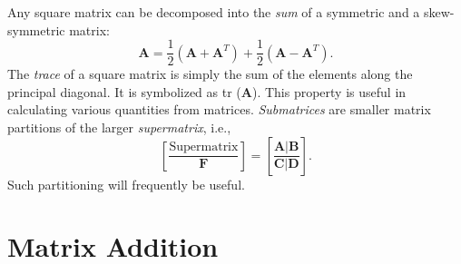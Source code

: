 Any square matrix can be decomposed into the \emph{sum} of a symmetric and a skew-symmetric matrix:
\begin{equation}
\mathbf{A} = \frac{1}{2} (\mathbf{A} + \mathbf{A}^T) + \frac{1}{2} (\mathbf{A} - \mathbf{A}^T).
\end{equation}
The \emph{trace} of a square matrix is simply the sum of the elements along the principal diagonal. It 
is symbolized as tr ($\mathbf{A}$).
This property is useful in calculating various quantities from matrices. 
\emph{Submatrices} are smaller matrix partitions of the larger \emph{supermatrix}, i.e.,
\begin{equation}
\left [ \frac{\mbox{Supermatrix}}{\mathbf{F}} \right] = \left[	\frac{\mathbf{A} | \mathbf{B}}{\mathbf{C} | \mathbf{D}} \right].
\end{equation}
Such partitioning will frequently be useful.
	 
\section{Matrix Addition}

